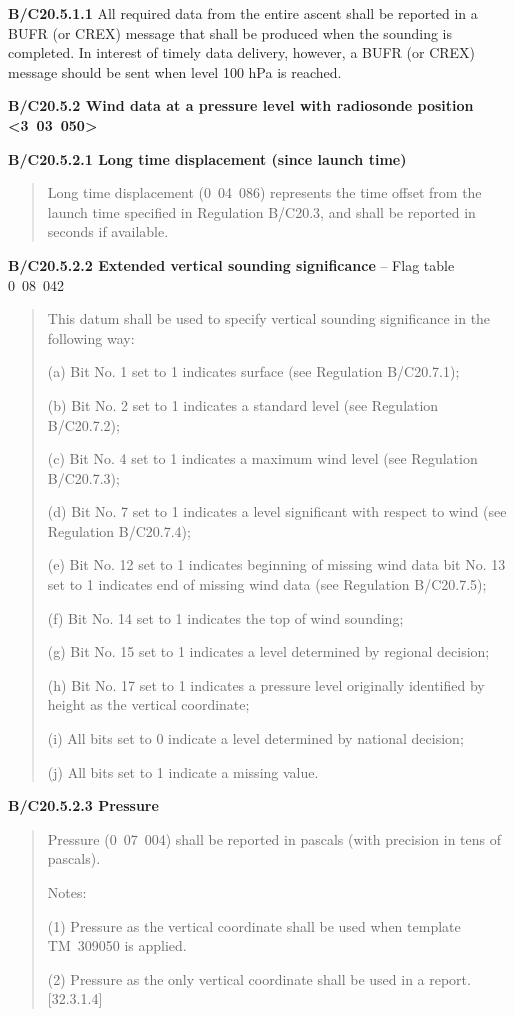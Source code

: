 \textbf{B/C20.5.1.1} All required data from the entire ascent shall be reported in a BUFR (or CREX) message that shall be produced when the sounding is completed. In interest of timely data delivery, however, a BUFR (or CREX) message should be sent when level 100 hPa is reached.

\textbf{B/C20.5.2 Wind data at a pressure level with radiosonde position \textless3~03~050\textgreater{}}

\textbf{B/C20.5.2.1 Long time displacement (since launch time)}

\begin{quote}
Long time displacement (0~04~086) represents the time offset from the launch time specified in Regulation B/C20.3, and shall be reported in seconds if available.
\end{quote}

\textbf{B/C20.5.2.2 Extended vertical sounding significance} -- Flag table 0~08~042

\begin{quote}
This datum shall be used to specify vertical sounding significance in the following way:

(a) Bit No. 1 set to 1 indicates surface (see Regulation B/C20.7.1);

(b) Bit No. 2 set to 1 indicates a standard level (see Regulation B/C20.7.2);

(c) Bit No. 4 set to 1 indicates a maximum wind level (see Regulation B/C20.7.3);

(d) Bit No. 7 set to 1 indicates a level significant with respect to wind (see Regulation B/C20.7.4);

(e) Bit No. 12 set to 1 indicates beginning of missing wind data bit No. 13 set to 1 indicates end of missing wind data (see Regulation B/C20.7.5);

(f) Bit No. 14 set to 1 indicates the top of wind sounding;

(g) Bit No. 15 set to 1 indicates a level determined by regional decision;

(h) Bit No. 17 set to 1 indicates a pressure level originally identified by height as the vertical coordinate;

(i) All bits set to 0 indicate a level determined by national decision;

(j) All bits set to 1 indicate a missing value.
\end{quote}

\textbf{B/C20.5.2.3 Pressure}

\begin{quote}
Pressure (0~07~004) shall be reported in pascals (with precision in tens of pascals).

Notes:

(1) Pressure as the vertical coordinate shall be used when template TM~309050 is applied.

(2) Pressure as the only vertical coordinate shall be used in a report. {[}32.3.1.4{]}
\end{quote}

